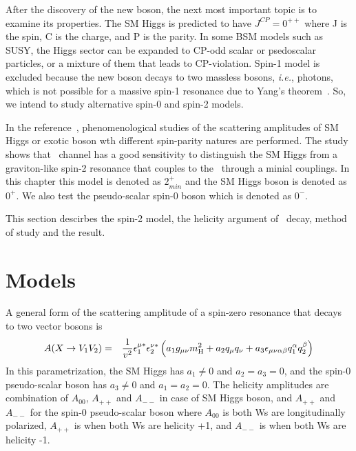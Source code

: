 
After the discovery of the new boson, the next most important topic is to examine its properties. 
The SM Higgs is predicted to have $J^{CP} = 0^{++}$ where J is the spin, C is the charge, 
and P is the parity. In some BSM models such as SUSY, 
the Higgs sector can be expanded to CP-odd scalar or psedoscalar particles, 
or a mixture of them that leads to CP-violation.
Spin-1 model is excluded because the new boson decays to two massless bosons, 
\textit{i.e.}, photons, which is not possible for a massive spin-1 resonance 
due to Yang's theorem~\cite{PhysRev.77.242}. 
So, we intend to study alternative spin-0 and spin-2 models.   


In the reference~\cite{Bolognesi:2012mm}, phenomenological studies of the scattering 
amplitudes of SM Higgs or exotic boson wth different spin-parity natures are performed.  
The study shows that \hww\ channel has a good 
sensitivity to distinguish the SM Higgs from a graviton-like spin-2 resonance that couples to 
the \ww\ through a minial couplings. In this chapter this model is denoted as $2_{min}^+$
and the SM Higgs boson is denoted as $0^+$. We also test the pseudo-scalar spin-0 
boson which is denoted as $0^-$.

This section descirbes the spin-2 model, the helicity argument 
of \ww\ decay, method of study and the result. 

\section{Models} 

A general form of the scattering amplitude of a spin-zero resonance that decays 
to two vector bosons is~\cite{Bolognesi:2012mm} 
\begin{eqnarray} 
A(X \rightarrow V_1V_2)
&=& 
\frac{1}{v^2} \epsilon^{\mu*}_1 \epsilon^{\nu*}_2 
\left( a_1 g_{\mu\nu}m_{\mathrm{H}}^2 + a_2q_\mu q_\nu 
     + a_3 \epsilon_{\mu\nu\alpha\beta} q_1^\alpha q_2^\beta \right)
\end{eqnarray} 
In this parametrization, the SM Higgs has $a_1 \neq 0$ and $a_2=a_3=0$, 
and the spin-0 pseudo-scalar boson has $a_3 \neq 0$ and $a_1=a_2=0$.
The helicity amplitudes are combination of $A_{00}$, $A_{++}$ and $A_{--}$ 
in case of SM Higgs boson, and $A_{++}$ and $A_{--}$ for the spin-0 
pseudo-scalar boson where $A_{00}$ is both Ws are longitudinally polarized, 
$A_{++}$ is when both Ws are helicity +1, and $A_{--}$ is when both Ws are helicity -1.  

